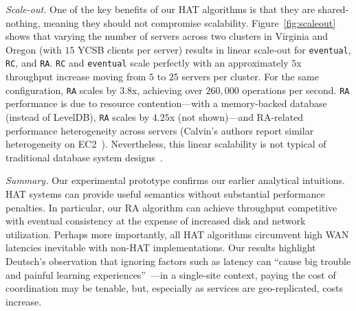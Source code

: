 \vspace{.5em}\noindent\textit{Scale-out.} One of the key benefits of
our HAT algorithms is that they are shared-nothing, meaning they
should not compromise scalability. Figure~\ref{fig:scaleout} shows
that varying the number of servers across two clusters in Virginia and
Oregon (with $15$ YCSB clients per server) results in linear scale-out
for \texttt{eventual}, \texttt{RC}, and \texttt{RA}. \texttt{RC} and
\texttt{eventual} scale perfectly with an approximately $5$x
throughput increase moving from $5$ to $25$ servers per cluster. For
the same configuration, \texttt{RA} scales by $3.8$x, achieving over
$260,000$ operations per second. \texttt{RA} performance is due to
resource contention---with a memory-backed database (instead of
LevelDB), \texttt{RA} scales by $4.25$x (not shown)---and RA-related
performance heterogeneity across servers (Calvin's authors report
similar heterogeneity on EC2~\cite{calvin}). Nevertheless, this linear
scalability is not typical of traditional database system
designs~\cite{gray-isolation}.

\vspace{.5em}\noindent\textit{Summary.} Our experimental prototype
confirms our earlier analytical intuitions. HAT systems can provide
useful semantics without substantial performance penalties. In
particular, our RA algorithm can achieve throughput competitive with
eventual consistency at the expense of increased disk and network
utilization. Perhaps more importantly, all HAT algorithms circumvent
high WAN latencies inevitable with non-HAT implementations. Our results
highlight Deutsch's observation that ignoring factors such as latency
can ``cause big trouble and painful learning
experiences''~\cite{fallacies-deutsch}---in a single-site context,
paying the cost of coordination may be tenable, but, especially as
services are geo-replicated, costs increase.
